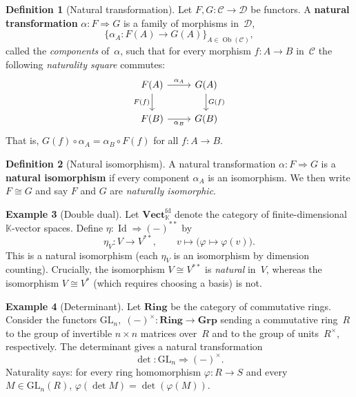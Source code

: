 \documentclass[a4paper,12pt]{book}
\DeclareMathOperator{\Id}{Id}
\DeclareMathOperator{\Ob}{Ob}
\newcommand{\Grp}{\mathbf{Grp}}
\newcommand{\Ring}{\mathbf{Ring}}
\newcommand{\Vect}{\mathbf{Vect}}
\newcommand{\K}{\mathbb{K}}
\theoremstyle{definition}
\newtheorem{definition}{Definition}[section]
\newtheorem{example}[definition]{Example}
\theoremstyle{plain}
\theoremstyle{remark}
\begin{document}

\begin{definition}[Natural transformation]\label{def:nat-trans}
Let $F,G\colon\mathcal{C}\to\mathcal{D}$ be functors.
A \textbf{natural transformation} $\alpha\colon F\Rightarrow G$ is a
family of morphisms in~$\mathcal{D}$,
\[
    \bigl\{\alpha_A\colon F(A)\to G(A)\bigr\}_{A\in\Ob(\mathcal{C})},
\]
called the \emph{components} of~$\alpha$, such that for every morphism
$f\colon A\to B$ in~$\mathcal{C}$ the following \emph{naturality square}
commutes:
\[
\begin{tikzcd}
    F(A) \arrow[r, "\alpha_A"] \arrow[d, "F(f)"'] &
    G(A) \arrow[d, "G(f)"] \\
    F(B) \arrow[r, "\alpha_B"'] &
    G(B)
\end{tikzcd}
\]
That is, $G(f)\circ\alpha_A = \alpha_B\circ F(f)$ for all
$f\colon A\to B$.
\end{definition}

\begin{definition}[Natural isomorphism]\label{def:nat-iso}
A natural transformation $\alpha\colon F\Rightarrow G$ is a
\textbf{natural isomorphism} if every component $\alpha_A$ is an
isomorphism.  We then write $F\cong G$ and say $F$ and $G$ are
\emph{naturally isomorphic}.
\end{definition}

\begin{example}[Double dual]\label{ex:double-dual}
Let $\Vect_\K^{\mathrm{fd}}$ denote the category of finite-dimensional
$\K$-vector spaces.  Define $\eta\colon\Id\Rightarrow(-)^{**}$ by
\[
    \eta_V\colon V\longrightarrow V^{**}, \qquad
    v\longmapsto\bigl(\varphi\mapsto\varphi(v)\bigr).
\]
This is a natural isomorphism (each $\eta_V$ is an isomorphism by
dimension counting).  Crucially, the isomorphism $V\cong V^{**}$ is
\emph{natural} in~$V$, whereas the isomorphism $V\cong V^*$ (which
requires choosing a basis) is not.
\end{example}

\begin{example}[Determinant]\label{ex:determinant-nat-trans}
Let $\Ring$ be the category of commutative rings.  Consider the functors
$\mathrm{GL}_n,\;(-)^\times\colon\Ring\to\Grp$ sending a
commutative ring~$R$ to the group of invertible $n\times n$ matrices over~$R$
and to the group of units~$R^\times$, respectively.
The determinant gives a natural transformation
\[
    \det\colon\mathrm{GL}_n\Longrightarrow(-)^\times.
\]
Naturality says: for every ring homomorphism $\varphi\colon R\to S$ and
every $M\in\mathrm{GL}_n(R)$,
$\varphi(\det M) = \det(\varphi(M))$.
\end{example}
\end{document}

